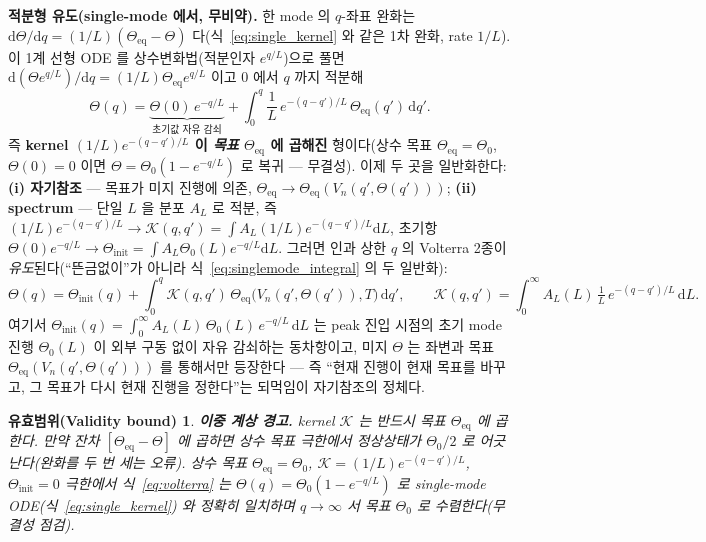 \documentclass[11pt,a4paper]{article}
\newtheorem*{boundbox}{유효범위(Validity bound)}
\newcommand{\dd}{\mathrm{d}}
\newcommand{\eq}{\mathrm{eq}}
\begin{document}
\textbf{적분형 유도(single-mode 에서, 무비약).} 한 mode 의 $q$-좌표 완화는 $\dd\Theta/\dd q=(1/L)(\Theta_\eq-\Theta)$
다(식~\eqref{eq:single_kernel} 와 같은 1차 완화, rate $1/L$). 이 1계 선형 ODE 를 상수변화법(적분인자 $e^{q/L}$)으로
풀면 $\dd(\Theta e^{q/L})/\dd q=(1/L)\Theta_\eq e^{q/L}$ 이고 $0$ 에서 $q$ 까지 적분해
\begin{equation}
\Theta(q)=\underbrace{\Theta(0)\,e^{-q/L}}_{\text{초기값 자유 감쇠}}+\int_0^q \frac1L\,e^{-(q-q')/L}\,\Theta_\eq(q')\,\dd q'.
\label{eq:singlemode_integral}
\end{equation}
즉 \textbf{kernel $(1/L)e^{-(q-q')/L}$ 이 \emph{목표} $\Theta_\eq$ 에 곱해진} 형이다(상수 목표 $\Theta_\eq=\Theta_0$,
$\Theta(0)=0$ 이면 $\Theta=\Theta_0(1-e^{-q/L})$ 로 복귀 — 무결성). 이제 두 곳을 일반화한다: \textbf{(i) 자기참조} —
목표가 미지 진행에 의존, $\Theta_\eq\to\Theta_\eq(V_n(q',\Theta(q')))$; \textbf{(ii) spectrum} — 단일 $L$ 을
분포 $A_L$ 로 적분, 즉 $(1/L)e^{-(q-q')/L}\to\mathcal K(q,q')=\int A_L(1/L)e^{-(q-q')/L}\dd L$, 초기항
$\Theta(0)e^{-q/L}\to\Theta_\mathrm{init}=\int A_L\Theta_0(L)e^{-q/L}\dd L$. 그러면 인과 상한 $q$ 의 Volterra 2종이
\emph{유도}된다(``뜬금없이''가 아니라 식~\eqref{eq:singlemode_integral} 의 두 일반화):
\begin{equation}
\Theta(q)=\Theta_\mathrm{init}(q)+\int_0^q \mathcal K(q,q')\,\Theta_\eq\big(V_n(q',\Theta(q')),T\big)\,\dd q',
\qquad \mathcal K(q,q')=\int_0^\infty A_L(L)\,\tfrac1L\,e^{-(q-q')/L}\,\dd L.
\label{eq:volterra}
\end{equation}
여기서 $\Theta_\mathrm{init}(q)=\int_0^\infty A_L(L)\,\Theta_0(L)\,e^{-q/L}\,\dd L$ 는 peak 진입 시점의 초기 mode
진행 $\Theta_0(L)$ 이 외부 구동 없이 자유 감쇠하는 동차항이고, 미지 $\Theta$ 는 좌변과 목표
$\Theta_\eq(V_n(q',\Theta(q')))$ 를 통해서만 등장한다 — 즉 ``현재 진행이 현재 목표를 바꾸고, 그 목표가 다시
현재 진행을 정한다''는 되먹임이 자기참조의 정체다.
\begin{boundbox}
\textbf{이중 계상 경고.} kernel $\mathcal K$ 는 반드시 \emph{목표} $\Theta_\eq$ 에 곱한다. 만약 잔차
$[\Theta_\eq-\Theta]$ 에 곱하면 상수 목표 극한에서 정상상태가 $\Theta_0/2$ 로 어긋난다(완화를 두 번 세는
오류). 상수 목표 $\Theta_\eq=\Theta_0$, $\mathcal K=(1/L)e^{-(q-q')/L}$, $\Theta_\mathrm{init}=0$ 극한에서
식~\eqref{eq:volterra} 는 $\Theta(q)=\Theta_0(1-e^{-q/L})$ 로 single-mode ODE(식~\eqref{eq:single_kernel})
와 정확히 일치하며 $q\to\infty$ 서 목표 $\Theta_0$ 로 수렴한다(무결성 점검).
\end{boundbox}
\end{document}
